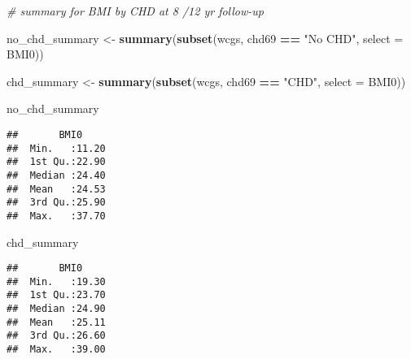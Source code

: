 \documentclass[]{article}
\newenvironment{Shaded}{\begin{snugshade}}{\end{snugshade}}
\newcommand{\CommentTok}[1]{\textcolor[rgb]{0.56,0.35,0.01}{\textit{#1}}}
\newcommand{\DataTypeTok}[1]{\textcolor[rgb]{0.13,0.29,0.53}{#1}}
\newcommand{\KeywordTok}[1]{\textcolor[rgb]{0.13,0.29,0.53}{\textbf{#1}}}
\newcommand{\NormalTok}[1]{#1}
\newcommand{\OperatorTok}[1]{\textcolor[rgb]{0.81,0.36,0.00}{\textbf{#1}}}
\newcommand{\StringTok}[1]{\textcolor[rgb]{0.31,0.60,0.02}{#1}}
\begin{document}
\begin{Shaded}
\begin{Highlighting}[]
\CommentTok{# summary for BMI by CHD at 8 /12 yr follow-up}

\NormalTok{no_chd_summary <-}\StringTok{ }\KeywordTok{summary}\NormalTok{(}\KeywordTok{subset}\NormalTok{(wcgs, chd69 }\OperatorTok{==}\StringTok{ "No CHD"}\NormalTok{, }\DataTypeTok{select =}\NormalTok{ BMI0))}

\NormalTok{chd_summary <-}\StringTok{ }\KeywordTok{summary}\NormalTok{(}\KeywordTok{subset}\NormalTok{(wcgs, chd69 }\OperatorTok{==}\StringTok{ "CHD"}\NormalTok{, }\DataTypeTok{select =}\NormalTok{ BMI0))}

\NormalTok{no_chd_summary}
\end{Highlighting}
\end{Shaded}

\begin{verbatim}
##       BMI0      
##  Min.   :11.20  
##  1st Qu.:22.90  
##  Median :24.40  
##  Mean   :24.53  
##  3rd Qu.:25.90  
##  Max.   :37.70
\end{verbatim}

\begin{Shaded}
\begin{Highlighting}[]
\NormalTok{chd_summary}
\end{Highlighting}
\end{Shaded}

\begin{verbatim}
##       BMI0      
##  Min.   :19.30  
##  1st Qu.:23.70  
##  Median :24.90  
##  Mean   :25.11  
##  3rd Qu.:26.60  
##  Max.   :39.00
\end{verbatim}
\end{document}
